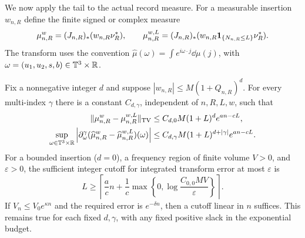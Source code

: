 We now apply the tail to the actual record measure. For a measurable
insertion $w_{n,R}$ define the finite signed or complex measure
\[
 \mu_{n,R}^{w}=(J_{n,R})_*(w_{n,R}\nu_R^*),\qquad
 \mu_{n,R}^{w,L}=(J_{n,R})_*
       (w_{n,R}\mathbf1_{\{N_{n,R}\le L\}}\nu_R^*).
\]
The transform uses the convention $\widehat\mu(\omega)=
\int e^{i\omega\cdot j}\dd\mu(j)$, with
$\omega=(u_1,u_2,s,b)\in\mathbb T^3\times\mathbb R$.

\begin{proposition}
\label{prop:linear-count-budget}
Fix a nonnegative integer $d$ and suppose
$|w_{n,R}|\le M(1+Q_{n,R})^d$. For every multi-index $\gamma$ there is a
constant $C_{d,\gamma}$, independent of $n,R,L,w$, such that
\begin{align}\label{eq:weighted-count-truncation}
 \|\mu_{n,R}^{w}-\mu_{n,R}^{w,L}\|_{\TV}
  &\le C_{d,0}M(1+L)^d e^{an-cL},\\
 \sup_{\omega\in\T^3\times\R}
 \left|\partial_\omega^\gamma
   (\widehat\mu_{n,R}^{w}-\widehat\mu_{n,R}^{w,L})(\omega)\right|
  &\le C_{d,\gamma}M(1+L)^{d+|\gamma|}e^{an-cL}.\nonumber
\end{align}
For a bounded insertion ($d=0$), a frequency region of finite volume
$V>0$, and $\varepsilon>0$, the sufficient integer cutoff for integrated
transform error at most $\varepsilon$ is
\begin{equation}\label{eq:linear-count-budget}
 L\ge\left\lceil\frac{a}{c}n+
       \frac1c\max\left\{0,\log\frac{C_{0,0}MV}{\varepsilon}\right\}
        \right\rceil.
\end{equation}
If $V_n\le V_0e^{\kappa n}$ and the required error is $e^{-\delta n}$,
then a cutoff linear in $n$ suffices. This remains true for each fixed
$d,\gamma$, with any fixed positive slack in the exponential budget.
\end{proposition}
